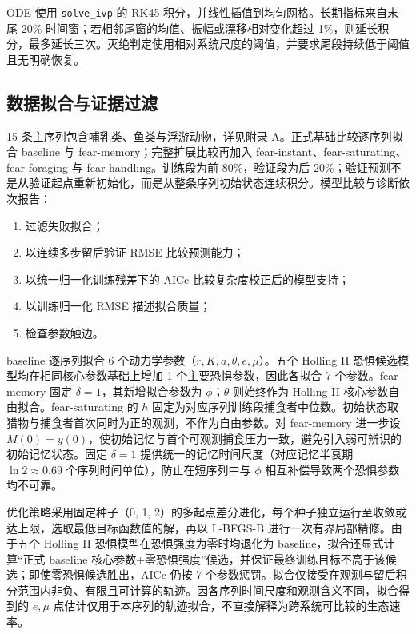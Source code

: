 \documentclass[12pt,a4paper]{ctexart}
\begin{document}
ODE 使用 \texttt{solve\_ivp} 的 RK45 积分，并线性插值到均匀网格。长期指标来自末尾 20\% 时间窗；若相邻尾窗的均值、振幅或漂移相对变化超过 1\%，则延长积分，最多延长三次。灭绝判定使用相对系统尺度的阈值，并要求尾段持续低于阈值且无明确恢复。

\subsection{数据拟合与证据过滤}

15 条主序列包含哺乳类、鱼类与浮游动物，详见附录 A。正式基础比较逐序列拟合 baseline 与 fear-memory；完整扩展比较再加入 fear-instant、fear-saturating、fear-foraging 与 fear-handling。训练段为前 80\%，验证段为后 20\%；验证预测不是从验证起点重新初始化，而是从整条序列初始状态连续积分。模型比较与诊断依次报告：
\begin{enumerate}[label=(\arabic*),leftmargin=2em]
 \item 过滤失败拟合；
 \item 以连续多步留后验证 RMSE 比较预测能力；
 \item 以统一归一化训练残差下的 AICc 比较复杂度校正后的模型支持；
 \item 以训练归一化 RMSE 描述拟合质量；
 \item 检查参数触边。
\end{enumerate}

baseline 逐序列拟合 6 个动力学参数（$r,K,a,\theta,e,\mu$）。五个 Holling II 恐惧候选模型均在相同核心参数基础上增加 1 个主要恐惧参数，因此各拟合 7 个参数。fear-memory 固定 $\delta=1$，其新增拟合参数为 $\phi$；$\theta$ 则始终作为 Holling II 核心参数自由拟合。fear-saturating 的 $h$ 固定为对应序列训练段捕食者中位数。初始状态取猎物与捕食者首次同时为正的观测，不作为自由参数。对 fear-memory 进一步设 $M(0)=y(0)$，使初始记忆与首个可观测捕食压力一致，避免引入弱可辨识的初始记忆状态。固定 $\delta=1$ 提供统一的记忆时间尺度（对应记忆半衰期 $\ln 2\approx 0.69$ 个序列时间单位），防止在短序列中与 $\phi$ 相互补偿导致两个恐惧参数均不可靠。

优化策略采用固定种子（0, 1, 2）的多起点差分进化，每个种子独立运行至收敛或达上限，选取最低目标函数值的解，再以 L-BFGS-B 进行一次有界局部精修。由于五个 Holling II 恐惧模型在恐惧强度为零时均退化为 baseline，拟合还显式计算“正式 baseline 核心参数+零恐惧强度”候选，并保证最终训练目标不高于该候选；即使零恐惧候选胜出，AICc 仍按 7 个参数惩罚。拟合仅接受在观测与留后积分范围内非负、有限且可计算的轨迹。因各序列时间尺度和观测含义不同，拟合得到的 $e,\mu$ 点估计仅用于本序列的轨迹拟合，不直接解释为跨系统可比较的生态速率。
\end{document}
